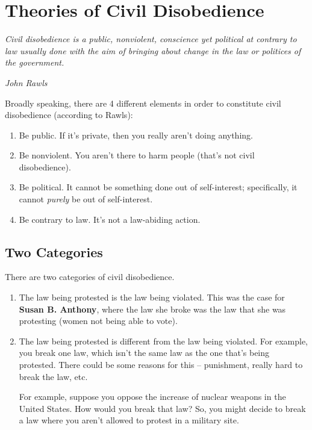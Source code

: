 \documentclass[letterpaper]{article}
\begin{document}
\section{Theories of Civil Disobedience}
\begin{mdframed}[]
    \begin{mdframed}[]
        \emph{Civil disobedience is a public, nonviolent, conscience yet political at contrary to law usually done with the aim of bringing about change in the law or politices of the government.}
    \end{mdframed}
    \emph{John Rawls}
\end{mdframed}
Broadly speaking, there are 4 different elements in order to constitute civil disobedience (according to Rawls): 
\begin{enumerate}
    \item Be public. If it's private, then you really aren't doing anything.
    \item Be nonviolent. You aren't there to harm people (that's not civil disobedience).
    \item Be political. It cannot be something done out of self-interest; specifically, it cannot \emph{purely} be out of self-interest.
    \item Be contrary to law. It's not a law-abiding action.
\end{enumerate}

\subsection{Two Categories}
There are two categories of civil disobedience.
\begin{enumerate}
    \item The law being protested is the law being violated. This was the case for \textbf{Susan B. Anthony}, where the law she broke was the law that she was protesting (women not being able to vote).
    
    \item The law being protested is different from the law being violated. For example, you break one law, which isn't the same law as the one that's being protested. There could be some reasons for this -- punishment, really hard to break the law, etc. 
    
    \bigskip
    
    For example, suppose you oppose the increase of nuclear weapons in the United States. How would you break that law? So, you might decide to break a law where you aren't allowed to protest in a military site. 
\end{enumerate}
\end{document}
